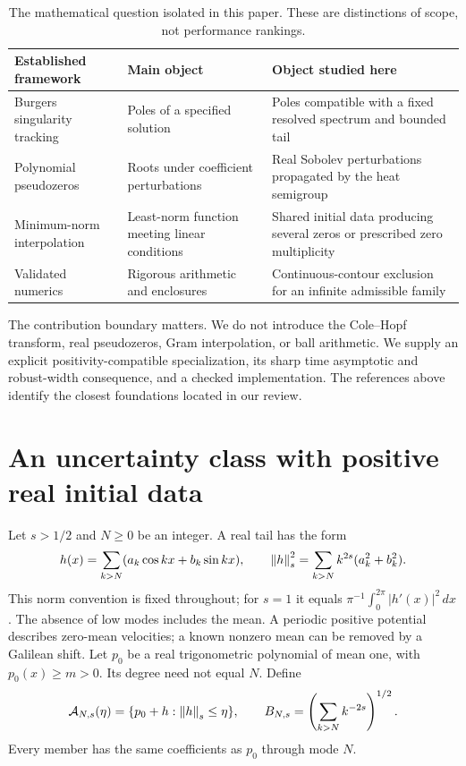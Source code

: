 \documentclass[11pt]{article}
\begin{document}
\begin{table}[t]
\centering\small
\caption{The mathematical question isolated in this paper. These are distinctions of scope, not performance rankings.}\label{tab:position}
\begin{tabular}{@{}>{\raggedright\arraybackslash}p{.27\linewidth}>{\raggedright\arraybackslash}p{.31\linewidth}>{\raggedright\arraybackslash}p{.35\linewidth}@{}}\toprule
Established framework & Main object & Object studied here\\\midrule
Burgers singularity tracking & Poles of a specified solution & Poles compatible with a fixed resolved spectrum and bounded tail\\
Polynomial pseudozeros & Roots under coefficient perturbations & Real Sobolev perturbations propagated by the heat semigroup\\
Minimum-norm interpolation & Least-norm function meeting linear conditions & Shared initial data producing several zeros or prescribed zero multiplicity\\
Validated numerics & Rigorous arithmetic and enclosures & Continuous-contour exclusion for an infinite admissible family\\\bottomrule
\end{tabular}
\end{table}

The contribution boundary matters. We do not introduce the Cole--Hopf transform, real pseudozeros, Gram interpolation, or ball arithmetic. We supply an explicit positivity-compatible specialization, its sharp time asymptotic and robust-width consequence, and a checked implementation. The references above identify the closest foundations located in our review.

\section{An uncertainty class with positive real initial data}
Let $s>1/2$ and $N\ge0$ be an integer. A real tail has the form
\begin{equation}\label{eq:tail}
 h(x)=\sum_{k>N}(a_k\cos kx+b_k\sin kx),\qquad
 \left\lVert h\right\rVert_s^2=\sum_{k>N}k^{2s}(a_k^2+b_k^2).
\end{equation}
This norm convention is fixed throughout; for $s=1$ it equals $\pi^{-1}\int_0^{2\pi}|h'(x)|^2\,dx$. The absence of low modes includes the mean. A periodic positive potential describes zero-mean velocities; a known nonzero mean can be removed by a Galilean shift. Let $p_0$ be a real trigonometric polynomial of mean one, with $p_0(x)\ge m>0$. Its degree need not equal $N$. Define
\begin{equation}\label{eq:uncertainty}
 \mathcal A_{N,s}(\eta)=\{p_0+h:\left\lVert h\right\rVert_s\le\eta\},\qquad
 B_{N,s}=\left(\sum_{k>N}k^{-2s}\right)^{1/2}.
\end{equation}
Every member has the same coefficients as $p_0$ through mode $N$.
\end{document}
